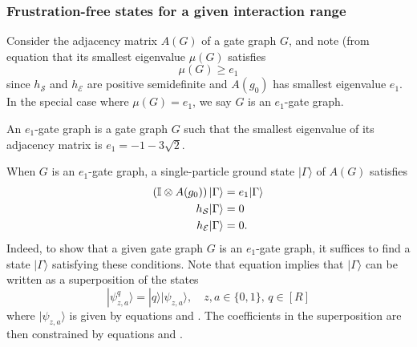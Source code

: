 \documentclass[../thesis-main/thesis-main]{subfiles}
\begin{document}
\subsubsection{Frustration-free states for a given interaction range}

Consider the adjacency matrix $A(G)$ of a gate graph $G$, and note (from equation  that its smallest eigenvalue $\mu(G)$ satisfies
\[
\mu(G)\geq e_{1}
\]
since $h_{\mathcal{S}}$ and $h_{\mathcal{E}}$ are positive semidefinite and $A(g_{0})$ has smallest eigenvalue $e_{1}$. In the special case where $\mu(G)=e_{1}$, we say $G$ is an $e_{1}$-gate graph.

\begin{definition}
An $e_{1}$-gate graph is a gate graph $G$ such that the smallest eigenvalue of its adjacency matrix is $e_{1}=-1-3\sqrt{2}$.
\end{definition}

When $G$ is an $e_{1}$-gate graph, a single-particle ground state $|\Gamma\rangle$ of $A(G)$ satisfies 
\begin{align}
\left(\mathbb{I}\otimes A(g_{0})\right)|\Gamma\rangle & =e_{1}|\Gamma\rangle\label{eq:Gamma_disc}\\
h_{\mathcal{S}}|\Gamma\rangle & =0\label{eq:h_s_0}\\
h_{\mathcal{E}}|\Gamma\rangle & =0.\label{eq:h_e_0}
\end{align}
Indeed, to show that a given gate graph $G$ is an $e_{1}$-gate graph, it suffices to find a state $|\Gamma\rangle$ satisfying these conditions. Note that equation  implies that $|\Gamma\rangle$ can be written as a superposition of the states
\[
  |\psi_{z,a}^{q}\rangle=|q\rangle|\psi_{z,a}\rangle,\quad
  z,a\in\{0,1\},\, q\in[R]
\]
where $|\psi_{z,a}\rangle$ is given by equations  and . The coefficients in the superposition are then constrained by equations  and .
 
\end{document}
